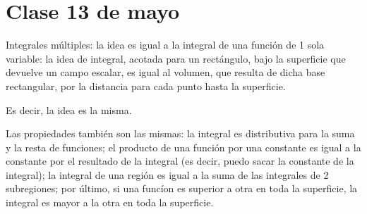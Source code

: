 \section{Clase 13 de mayo}

Integrales múltiples:
la idea es igual a la integral de una función de 1 sola variable:
la idea de integral, acotada para un rectángulo,
bajo la superficie que devuelve un campo escalar,
es igual al volumen,
que resulta de dicha base rectangular,
por la distancia para cada punto hasta la superficie.

Es decir,
la idea es la misma.

Las propiedades también son las mismas:
la integral es distributiva para la suma y la resta de funciones;
el producto de una función por una constante es igual a la constante por el resultado de la integral
(es decir, puedo sacar la constante de la integral);
la integral de una región es igual a la suma de las integrales de 2 subregiones;
por último,
si una funcíon es superior a otra en toda la superficie, 
la integral es mayor a la otra en toda la superficie.